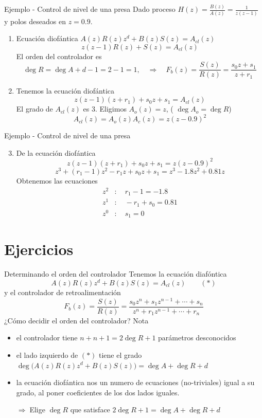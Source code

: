 \documentclass[presentation,aspectratio=169]{beamer}
\begin{document}
\begin{frame}[label={sec:orgbcc8ef0}]{Ejemplo - Control de nivel de una presa}
Dado proceso \(H(z) = \frac{B(z)}{A(z)} = \frac{1}{z(z-1)}\) y polos deseados en \(z=0.9\).

\begin{enumerate}
\item Ecuación diofántica \(A(z)R(z)z^d + B(z)S(z) = A_{cl}(z)\)
\[ z(z-1)R(z) + S(z) = A_{cl}(z)\]
El orden del controlador es 
\[\deg R = \deg A + d - 1 = 2-1 = 1, \quad \Rightarrow \quad F_b(z)=\frac{S(z)}{R(z)} = \frac{s_0z + s_1}{z + r_1}\]
\item Tenemos la ecuación diofántica
\[ z(z-1)(z+r_1) + s_0z + s_1 = A_{cl}(z)\]
El grado de \(A_{cl}(z)\) es 3. Eligimos \(A_o(z) = z\),  ( \(\deg A_o = \deg R\)) 
\[ A_{cl}(z) = A_o(z) A_c(z) = z(z-0.9)^2\]
\end{enumerate}
\end{frame}

\begin{frame}[label={sec:orgd073882}]{Ejemplo - Control de nivel de una presa}
\begin{enumerate}
\setcounter{enumi}{2}
\item De la ecuación diofántica \[ z(z-1)(z+r_1) + s_0z + s_1 = z(z-0.9)^2\]
\[ z^3 + (r_1-1)z^2 - r_1z + s_0z + s_1 = z^3 -1.8z^2 + 0.81z\]
Obtenemos las ecuaciones 
\begin{align*}
z^2 &: \quad r_1-1 = -1.8\\
z^1 &: \quad -r_1 + s_0 = 0.81\\
z^0 &: \quad s_1 = 0
\end{align*}
\end{enumerate}
\end{frame}


\section{Ejercicios}
\label{sec:org5199c99}
\begin{frame}[label={sec:orgf39da84}]{Determinando el orden del controlador}
Tenemos la ecuación diafóntica
   \[ A(z)R(z)z^{d} + B(z)S(z) = A_{cl}(z) \qquad (*) \]
y el controlador de retroalimentación
\[F_b(z) = \frac{S(z)}{R(z)} = \frac{s_0z^n + s_1z^{n-1} + \cdots + s_n}{z^n + r_1 z^{n-1} + \cdots + r_n}\]
\alert{¿Cómo decidir el orden del controlador?} Nota
\begin{itemize}
\item el controlador tiene \(n+n+1 = 2\deg R + 1\) parámetros desconocidos
\item el lado izquierdo de \((*)\) tiene el grado \(\deg \big(A(z)R(z)z^d + B(z)S(z)\big) = \deg A + \deg R + d\)
\item la ecuación diofántica nos un numero de ecuaciones (no-triviales) igual a su grado, al poner coeficientes de los dos lados iguales.

\alert{\(\Rightarrow\;\)Elige \(\deg R\) que satisface \(2\deg R + 1 = \deg A + \deg R + d\)}
\end{itemize}
\end{frame}
\end{document}
